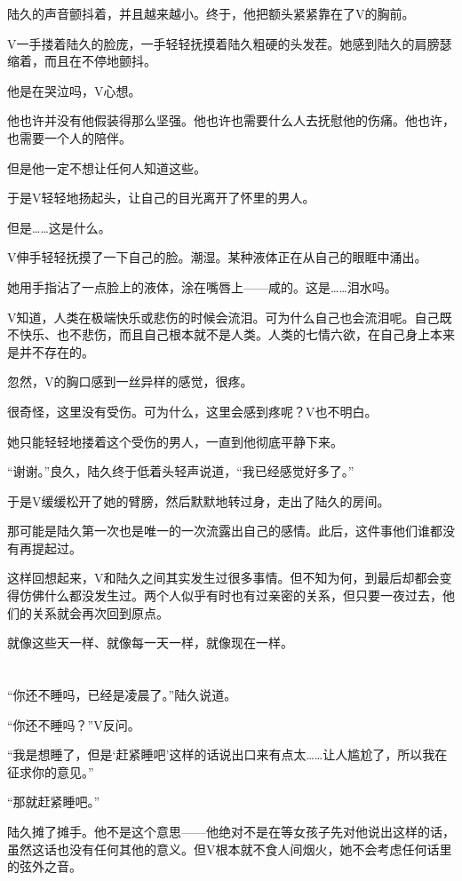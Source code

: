 陆久的声音颤抖着，并且越来越小。终于，他把额头紧紧靠在了V的胸前。

V一手搂着陆久的脸庞，一手轻轻抚摸着陆久粗硬的头发茬。她感到陆久的肩膀瑟缩着，而且在不停地颤抖。

他是在哭泣吗，V心想。

他也许并没有他假装得那么坚强。他也许也需要什么人去抚慰他的伤痛。他也许，也需要一个人的陪伴。

但是他一定不想让任何人知道这些。

于是V轻轻地扬起头，让自己的目光离开了怀里的男人。

但是……这是什么。

V伸手轻轻抚摸了一下自己的脸。潮湿。某种液体正在从自己的眼眶中涌出。

她用手指沾了一点脸上的液体，涂在嘴唇上——咸的。这是……泪水吗。

V知道，人类在极端快乐或悲伤的时候会流泪。可为什么自己也会流泪呢。自己既不快乐、也不悲伤，而且自己根本就不是人类。人类的七情六欲，在自己身上本来是并不存在的。

忽然，V的胸口感到一丝异样的感觉，很疼。

很奇怪，这里没有受伤。可为什么，这里会感到疼呢？V也不明白。

她只能轻轻地搂着这个受伤的男人，一直到他彻底平静下来。

“谢谢。”良久，陆久终于低着头轻声说道，“我已经感觉好多了。”

于是V缓缓松开了她的臂膀，然后默默地转过身，走出了陆久的房间。

那可能是陆久第一次也是唯一的一次流露出自己的感情。此后，这件事他们谁都没有再提起过。

这样回想起来，V和陆久之间其实发生过很多事情。但不知为何，到最后却都会变得仿佛什么都没发生过。两个人似乎有时也有过亲密的关系，但只要一夜过去，他们的关系就会再次回到原点。

就像这些天一样、就像每一天一样，就像现在一样。

\section*{}

“你还不睡吗，已经是凌晨了。”陆久说道。

“你还不睡吗？”V反问。

“我是想睡了，但是‘赶紧睡吧’这样的话说出口来有点太……让人尴尬了，所以我在征求你的意见。”

“那就赶紧睡吧。”

陆久摊了摊手。他不是这个意思——他绝对不是在等女孩子先对他说出这样的话，虽然这话也没有任何其他的意义。但V根本就不食人间烟火，她不会考虑任何话里的弦外之音。

